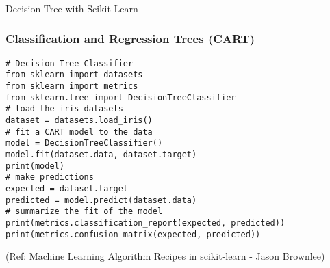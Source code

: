 \begin{frame}[fragile]\frametitle{}
\begin{center}
{\Large Decision Tree with Scikit-Learn}
\end{center}
\end{frame}

\begin{frame}[fragile]\frametitle{Classification and Regression Trees (CART)}
\begin{lstlisting}
# Decision Tree Classifier
from sklearn import datasets
from sklearn import metrics
from sklearn.tree import DecisionTreeClassifier
# load the iris datasets
dataset = datasets.load_iris()
# fit a CART model to the data
model = DecisionTreeClassifier()
model.fit(dataset.data, dataset.target)
print(model)
# make predictions
expected = dataset.target
predicted = model.predict(dataset.data)
# summarize the fit of the model
print(metrics.classification_report(expected, predicted))
print(metrics.confusion_matrix(expected, predicted))
\end{lstlisting}

{\tiny (Ref: Machine Learning Algorithm Recipes in scikit-learn - Jason Brownlee)}

\end{frame}









